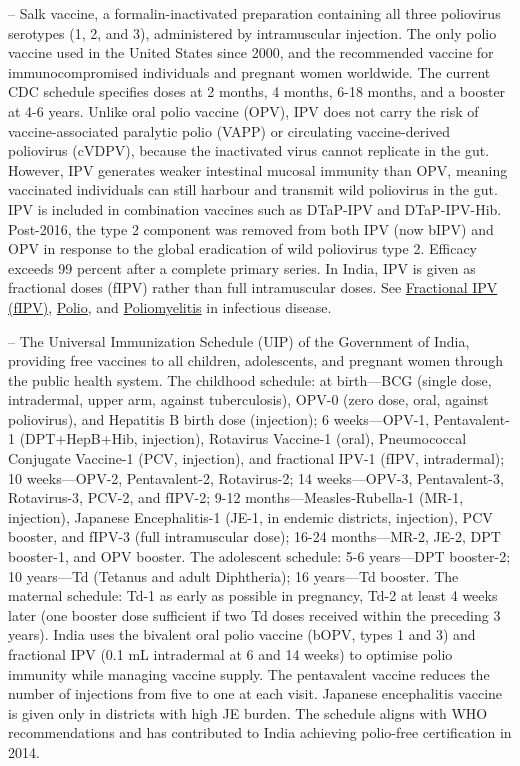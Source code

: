 -- Salk vaccine, a formalin-inactivated preparation containing all three poliovirus serotypes (1, 2, and 3), administered by intramuscular injection. The only polio vaccine used in the United States since 2000, and the recommended vaccine for immunocompromised individuals and pregnant women worldwide. The current CDC schedule specifies doses at 2 months, 4 months, 6-18 months, and a booster at 4-6 years. Unlike oral polio vaccine (OPV), IPV does not carry the risk of vaccine-associated paralytic polio (VAPP) or circulating vaccine-derived poliovirus (cVDPV), because the inactivated virus cannot replicate in the gut. However, IPV generates weaker intestinal mucosal immunity than OPV, meaning vaccinated individuals can still harbour and transmit wild poliovirus in the gut. IPV is included in combination vaccines such as DTaP-IPV and DTaP-IPV-Hib. Post-2016, the type 2 component was removed from both IPV (now bIPV) and OPV in response to the global eradication of wild poliovirus type 2. Efficacy exceeds 99 percent after a complete primary series. In India, IPV is given as fractional doses (fIPV) rather than full intramuscular doses. See \hyperlink{Fractional IPV (fIPV)}{Fractional IPV (fIPV)}, \hyperlink{Polio}{Polio}, and \hyperlink{Poliomyelitis}{Poliomyelitis} in infectious disease.

-- The Universal Immunization Schedule (UIP) of the Government of India, providing free vaccines to all children, adolescents, and pregnant women through the public health system. The childhood schedule: at birth---BCG (single dose, intradermal, upper arm, against tuberculosis), OPV-0 (zero dose, oral, against poliovirus), and Hepatitis B birth dose (injection); 6 weeks---OPV-1, Pentavalent-1 (DPT+HepB+Hib, injection), Rotavirus Vaccine-1 (oral), Pneumococcal Conjugate Vaccine-1 (PCV, injection), and fractional IPV-1 (fIPV, intradermal); 10 weeks---OPV-2, Pentavalent-2, Rotavirus-2; 14 weeks---OPV-3, Pentavalent-3, Rotavirus-3, PCV-2, and fIPV-2; 9-12 months---Measles-Rubella-1 (MR-1, injection), Japanese Encephalitis-1 (JE-1, in endemic districts, injection), PCV booster, and fIPV-3 (full intramuscular dose); 16-24 months---MR-2, JE-2, DPT booster-1, and OPV booster. The adolescent schedule: 5-6 years---DPT booster-2; 10 years---Td (Tetanus and adult Diphtheria); 16 years---Td booster. The maternal schedule: Td-1 as early as possible in pregnancy, Td-2 at least 4 weeks later (one booster dose sufficient if two Td doses received within the preceding 3 years). India uses the bivalent oral polio vaccine (bOPV, types 1 and 3) and fractional IPV (0.1 mL intradermal at 6 and 14 weeks) to optimise polio immunity while managing vaccine supply. The pentavalent vaccine reduces the number of injections from five to one at each visit. Japanese encephalitis vaccine is given only in districts with high JE burden. The schedule aligns with WHO recommendations and has contributed to India achieving polio-free certification in 2014.

